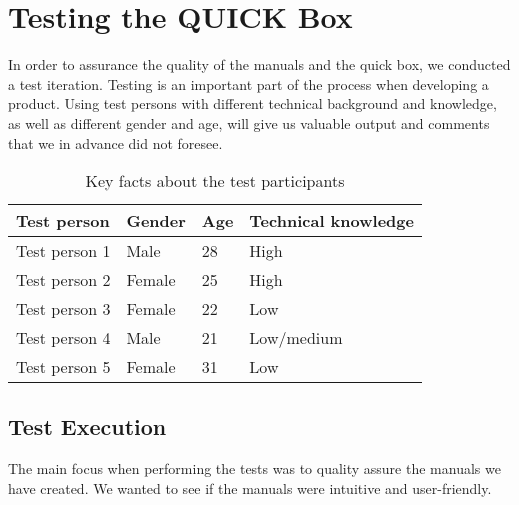 \chapter{Testing the QUICK Box}
\label{chp:test} 

In order to assurance the quality of the manuals and the \gls{quick} box, we conducted a test iteration. Testing is an important part of the process when developing a product. Using test persons with different technical background and knowledge, as well as different gender and age, will give us valuable output and comments that we in advance did not foresee. 

\begin{center}
\begin{table}[h!]
\caption{\label{tab:testpersons}Key facts about the test participants}
    \begin{tabular}{ | l | l | l | l |}
    \hline
    \textbf{Test person} & \textbf{Gender} & \textbf{Age} & \textbf{Technical knowledge} \\ 
    \hline
    Test person 1 &  Male & 28 & High\\ 
    \hline
    Test person 2 &  Female & 25 & High\\  
    \hline
    Test person 3 &  Female & 22 & Low\\  
    \hline
    Test person 4 &  Male & 21 & Low/medium\\  
    \hline
    Test person 5 &  Female & 31 & Low \\  
    \hline
    \end{tabular}
   \end{table}
\end{center}


\section{Test Execution}
The main focus when performing the tests was to quality assure the manuals we have created. We wanted to see if the manuals were intuitive and user-friendly.

